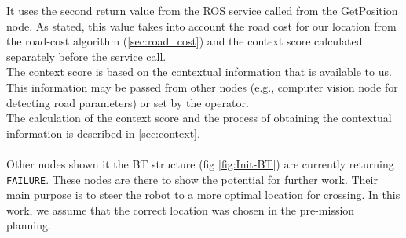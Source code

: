         It uses the second return value from the ROS service called from the GetPosition node. As stated, this value takes into account the road cost for our location from the road-cost algorithm (\ref{sec:road_cost}) and the context score calculated separately before the service call.\\
        The context score is based on the contextual information that is available to us. This information may be passed from other nodes (e.g., computer vision node for detecting road parameters) or set by the operator.\\
        The calculation of the context score and the process of obtaining the contextual information is described in \ref{sec:context}.\\\\

    \noindent Other nodes shown it the BT structure (fig \ref{fig:Init-BT}) are currently returning \texttt{FAILURE}. These nodes are there to show the potential for further work. Their main purpose is to steer the robot to a more optimal location for crossing. In this work, we assume that the correct location was chosen in the pre-mission planning.
